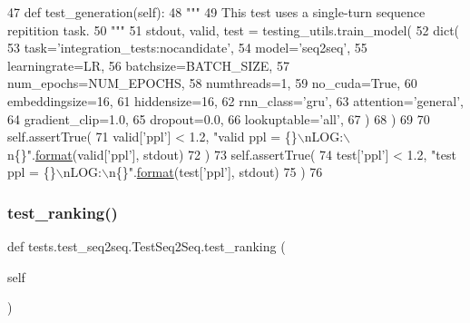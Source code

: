 \begin{DoxyCode}
47     \textcolor{keyword}{def }test\_generation(self):
48         \textcolor{stringliteral}{"""}
49 \textcolor{stringliteral}{        This test uses a single-turn sequence repitition task.}
50 \textcolor{stringliteral}{        """}
51         stdout, valid, test = testing\_utils.train\_model(
52             dict(
53                 task=\textcolor{stringliteral}{'integration\_tests:nocandidate'},
54                 model=\textcolor{stringliteral}{'seq2seq'},
55                 learningrate=LR,
56                 batchsize=BATCH\_SIZE,
57                 num\_epochs=NUM\_EPOCHS,
58                 numthreads=1,
59                 no\_cuda=\textcolor{keyword}{True},
60                 embeddingsize=16,
61                 hiddensize=16,
62                 rnn\_class=\textcolor{stringliteral}{'gru'},
63                 attention=\textcolor{stringliteral}{'general'},
64                 gradient\_clip=1.0,
65                 dropout=0.0,
66                 lookuptable=\textcolor{stringliteral}{'all'},
67             )
68         )
69 
70         self.assertTrue(
71             valid[\textcolor{stringliteral}{'ppl'}] < 1.2, \textcolor{stringliteral}{"valid ppl = \{\}\(\backslash\)nLOG:\(\backslash\)n\{\}"}.\hyperlink{namespaceparlai_1_1chat__service_1_1services_1_1messenger_1_1shared__utils_a32e2e2022b824fbaf80c747160b52a76}{format}(valid[\textcolor{stringliteral}{'ppl'}], stdout)
72         )
73         self.assertTrue(
74             test[\textcolor{stringliteral}{'ppl'}] < 1.2, \textcolor{stringliteral}{"test ppl = \{\}\(\backslash\)nLOG:\(\backslash\)n\{\}"}.\hyperlink{namespaceparlai_1_1chat__service_1_1services_1_1messenger_1_1shared__utils_a32e2e2022b824fbaf80c747160b52a76}{format}(test[\textcolor{stringliteral}{'ppl'}], stdout)
75         )
76 
\end{DoxyCode}
\mbox{\label{classtests_1_1test__seq2seq_1_1TestSeq2Seq_a967d49fc0e124148c7ac4488dd788bc7}} 
\subsubsection{\texorpdfstring{test\+\_\+ranking()}{test\_ranking()}}
{\footnotesize\ttfamily def tests.\+test\+\_\+seq2seq.\+Test\+Seq2\+Seq.\+test\+\_\+ranking (\begin{DoxyParamCaption}\item[{}]{self }\end{DoxyParamCaption})}



